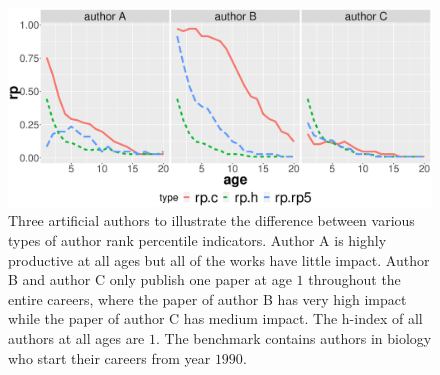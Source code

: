 \begin{figure}[ht!]
    \centering
    \includegraphics[width=\textwidth]{figures/compare_autrp/simulated_authors.eps}
    \caption{Three artificial authors to illustrate the difference between various types of author rank percentile indicators. Author A is highly productive at all ages but all of the works have little impact. Author B and author C only publish one paper at age $1$ throughout the entire careers, where the paper of author B has very high impact while the paper of author C has medium impact. The h-index of all authors at all ages are $1$. The benchmark contains authors in biology who start their careers from year $1990$.}
    \label{fig:simulated_authors}
\end{figure}


